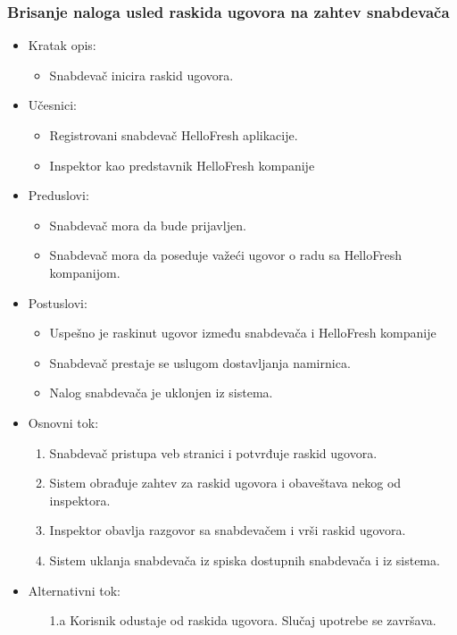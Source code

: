 
\subsubsection{Brisanje naloga usled raskida ugovora na zahtev snabdevača}

\begin{itemize}
    \item Kratak opis:
        \begin{itemize}
            \item Snabdevač inicira raskid ugovora.
        \end{itemize}
    \item Učesnici:
        \begin{itemize}
            \item Registrovani snabdevač HelloFresh aplikacije.
            \item Inspektor kao predstavnik HelloFresh kompanije
        \end{itemize}
    \item Preduslovi:
        \begin{itemize}
            \item Snabdevač mora da bude prijavljen.
            \item Snabdevač mora da poseduje važeći ugovor o radu sa HelloFresh kompanijom.
        \end{itemize}
    \item Postuslovi:
        \begin{itemize}
            \item Uspešno je raskinut ugovor između snabdevača i HelloFresh kompanije
            \item Snabdevač prestaje se uslugom dostavljanja namirnica.
            \item Nalog snabdevača je uklonjen iz sistema.
        \end{itemize}
    \item Osnovni tok:
        \begin{enumerate}
            \item Snabdevač pristupa veb stranici i potvrđuje raskid ugovora.
            \item Sistem obrađuje zahtev za raskid ugovora i obaveštava nekog od inspektora.
            \item Inspektor obavlja razgovor sa snabdevačem i vrši raskid ugovora.
            \item Sistem uklanja snabdevača iz spiska dostupnih snabdevača i iz sistema.
        \end{enumerate}
    \item Alternativni tok:
        \begin{itemize}
            \item[1.a] Korisnik odustaje od raskida ugovora. Slučaj upotrebe se završava.
        \end{itemize}
\end{itemize}

